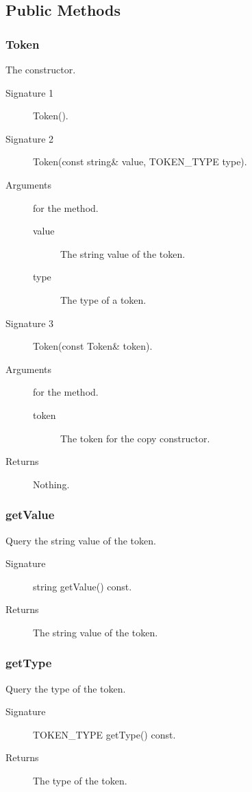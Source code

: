 \subsection{Public Methods}

\subsubsection{Token}
The constructor.
\begin{description}
  \item [Signature 1] Token().
  \item [Signature 2] Token(const string\& value, TOKEN\_TYPE type).
  \item [Arguments] for the method.
     \begin{description}
        \item [value] The string value of the token.
        \item [type]  The type of a token.
     \end{description}
  \item [Signature 3] Token(const Token\& token).
  \item [Arguments] for the method.
     \begin{description}
        \item [token] The token for the copy constructor.
     \end{description}
  \item [Returns] Nothing.
\end{description}

\subsubsection{getValue}
Query the string value of the token.
\begin{description}
  \item [Signature] string getValue() const.
  \item [Returns] The string value of the token.
\end{description}

\subsubsection{getType}
Query the type of the token.
\begin{description}
  \item [Signature] TOKEN\_TYPE getType() const.
  \item [Returns] The type of the token.
\end{description}

